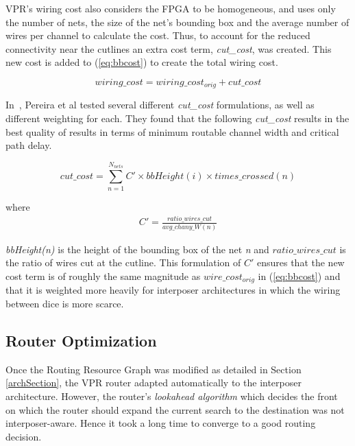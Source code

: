 \documentclass{sig-alternate-2013}
\begin{document}
VPR's wiring cost also considers the FPGA to be homogeneous, and uses only the number of nets, the size of the net's bounding box and the average number of wires per channel to calculate the cost. Thus, to account for the reduced connectivity near the cutlines an extra cost term, \textit{cut\_cost}, was created. This new cost is added to (\ref{eq:bbcost}) to create the total wiring cost.

\begin{equation} \label{eq:total_wiring}
wiring\_cost = wiring\_cost_{orig} + cut\_cost
\end{equation}

In~\cite{hahn2014cad}, Pereira et al tested several different \textit{cut\_cost} formulations, as well as different weighting for each. They found that the following \textit{cut\_cost} results in the best quality of results in terms of minimum routable channel width and critical path delay.

\begin{equation} \label{eq:cost2}
cut\_cost = \sum_{n=1}^{N_{nets}} C' \times bbHeight(i) \times times\_crossed(n)
\end{equation}

where 
\begin{equation} \label{eq:cprime}
\begin{split}
C' = \frac{ratio\_wires\_cut}{avg\_chany\_W(n)}
\end{split}
\end{equation}

\textit{bbHeight(n)} is the height of the bounding box of the net \textit{n} and $ratio\_wires\_cut$ is the ratio of wires cut at the cutline. This formulation of $C'$ ensures that the new cost term is of roughly the same magnitude as $wire\_cost_{orig}$ in (\ref{eq:bbcost}) and that it is weighted more heavily for interposer architectures in which the wiring between dice is more scarce.

\subsection{Router Optimization}
Once the Routing Resource Graph was modified as detailed in Section \ref{archSection}, the VPR router adapted automatically to the interposer architecture. However, the router's \textit{lookahead algorithm} which decides the front on which the router should expand the current search to the destination was not interposer-aware. Hence it took a long time to converge to a good routing decision. 
\end{document}
